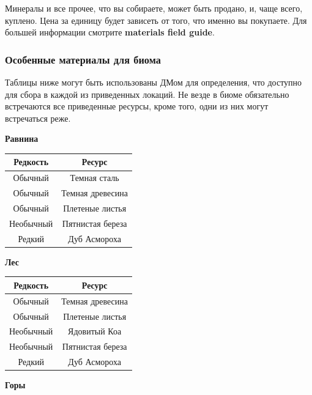 \documentclass[a4paper, 9pt, twocolumn]{book}
\begin{document}
	Минералы и все прочее, что вы собираете, может быть продано, и, чаще всего, куплено. Цена за единицу будет зависеть от того, что именно вы покупаете. Для большей информации смотрите \textbf{materials field guide}.
	
	\subsubsection{Особенные материалы для биома}
	
	Таблицы ниже могут быть использованы ДМом для определения, что доступно для сбора в каждой из приведенных локаций. Не везде в биоме обязательно встречаются все приведенные ресурсы, кроме того, одни из них могут встречаться реже. 
	
	\begin{minipage}{0.45\linewidth}
		\centering
		\textbf{Равнина}
		
		\begin{tabular}{|c|c|}
			\hline
			\textbf{Редкость} & \textbf{Ресурс} \\
			\hline
			Обычный & Темная сталь \\
			\hline
			Обычный & Темная древесина \\
			\hline
			Обычный & Плетеные листья \\
			\hline
			Необычный & Пятнистая береза \\
			\hline
			Редкий & Дуб Асмороха \\
			\hline
		\end{tabular}
	
		\medspace
		
		\textbf{Лес}
		
		\begin{tabular}{|c|c|}
			\hline
			\textbf{Редкость} & \textbf{Ресурс} \\
			\hline
			Обычный & Темная древесина \\
			\hline
			Обычный & Плетеные листья \\
			\hline
			Необычный & Ядовитый Коа \\
			\hline
			Необычный & Пятнистая береза \\
			\hline
			Редкий & Дуб Асмороха \\
			\hline
		\end{tabular}
	
		\medspace
		
		\textbf{Горы}
		

\end{minipage}
\end{document}
